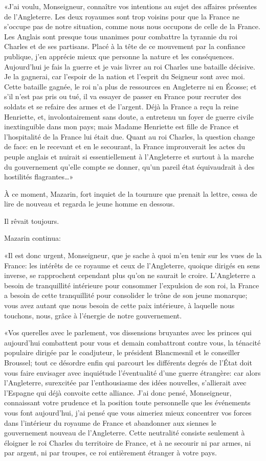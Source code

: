 «J'ai voulu, Monseigneur, connaître vos intentions au sujet des affaires présentes de l'Angleterre. Les deux royaumes sont trop voisins pour que la France ne s'occupe pas de notre situation, comme nous nous occupons de celle de la France. Les Anglais sont presque tous unanimes pour combattre la tyrannie du roi Charles et de ses partisans. Placé à la tête de ce mouvement par la confiance publique, j'en apprécie mieux que personne la nature et les conséquences. Aujourd'hui je fais la guerre et je vais livrer au roi Charles une bataille décisive. Je la gagnerai, car l'espoir de la nation et l'esprit du Seigneur sont avec moi. Cette bataille gagnée, le roi n'a plus de ressources en Angleterre ni en Écosse; et s'il n'est pas pris ou tué, il va essayer de passer en France pour recruter des soldats et se refaire des armes et de l'argent. Déjà la France a reçu la reine Henriette, et, involontairement sans doute, a entretenu un foyer de guerre civile inextinguible dans mon pays; mais Madame Henriette est fille de France et l'hospitalité de la France lui était due. Quant au roi Charles, la question change de face: en le recevant et en le secourant, la France improuverait les actes du peuple anglais et nuirait si essentiellement à l'Angleterre et surtout à la marche du gouvernement qu'elle compte se donner, qu'un pareil état équivaudrait à des hostilités flagrantes\dots»

À ce moment, Mazarin, fort inquiet de la tournure que prenait la lettre, cessa de lire de nouveau et regarda le jeune homme en dessous.

Il rêvait toujours.

Mazarin continua:

«Il est donc urgent, Monseigneur, que je sache à quoi m'en tenir sur les vues de la France: les intérêts de ce royaume et ceux de l'Angleterre, quoique dirigés en sens inverse, se rapprochent cependant plus qu'on ne saurait le croire. L'Angleterre a besoin de tranquillité intérieure pour consommer l'expulsion de son roi, la France a besoin de cette tranquillité pour consolider le trône de son jeune monarque; vous avez autant que nous besoin de cette paix intérieure, à laquelle nous touchons, nous, grâce à l'énergie de notre gouvernement.

«Vos querelles avec le parlement, vos dissensions bruyantes avec les princes qui aujourd'hui combattent pour vous et demain combattront contre vous, la ténacité populaire dirigée par le coadjuteur, le président Blancmesnil et le conseiller Broussel; tout ce désordre enfin qui parcourt les différents degrés de l'État doit vous faire envisager avec inquiétude l'éventualité d'une guerre étrangère: car alors l'Angleterre, surexcitée par l'enthousiasme des idées nouvelles, s'allierait avec l'Espagne qui déjà convoite cette alliance. J'ai donc pensé, Monseigneur, connaissant votre prudence et la position toute personnelle que les événements vous font aujourd'hui, j'ai pensé que vous aimeriez mieux concentrer vos forces dans l'intérieur du royaume de France et abandonner aux siennes le gouvernement nouveau de l'Angleterre. Cette neutralité consiste seulement à éloigner le roi Charles du territoire de France, et à ne secourir ni par armes, ni par argent, ni par troupes, ce roi entièrement étranger à votre pays.

